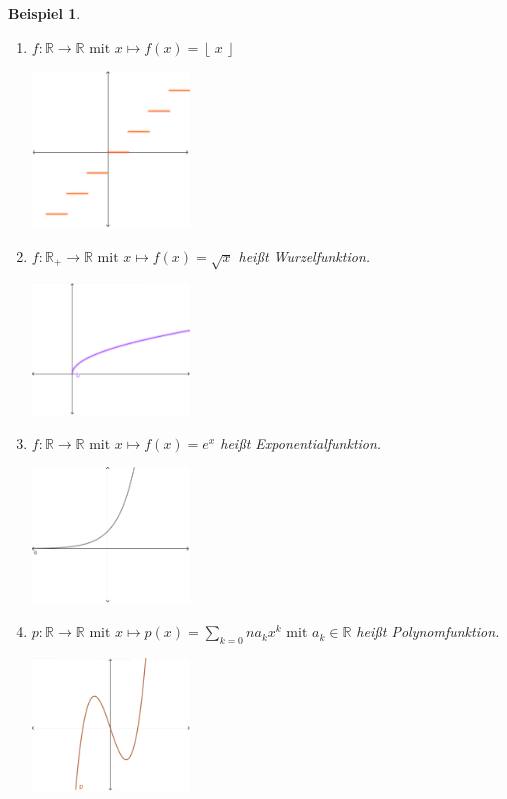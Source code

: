 \documentclass[a4paper,titlepage,oneside]{article}
\def\R{\ensuremath{\mathbb{R}} }
\newcommand{\floor}[1]{\ensuremath{\left\lfloor\:#1\:\right\rfloor}}
\theoremstyle{thmstyle}
\newtheorem{bsp}[satz]{Beispiel}
\theoremstyle{subthmstyle}
\begin{document}
\begin{bsp}
\begin{enumerate}
\begin{center}
\end{center}
\item $f : \R \to \R \text{ mit } x \mapsto f(x) = \floor{x} $ 
\begin{center}
 \includegraphics[width=0.33\textwidth]{images/floor_funktion.png}
\end{center}
\item $f : \R_+ \to \R \text{ mit } x \mapsto f(x) = \sqrt{x} $ heißt Wurzelfunktion. 
\begin{center}
 \includegraphics[width=0.33\textwidth]{images/wurzel_funktion.png}
\end{center}
\item $f : \R \to \R \text{ mit } x \mapsto f(x) = e^x $ heißt Exponentialfunktion. 
\begin{center}
 \includegraphics[width=0.33\textwidth]{images/exponential_funktion.png}
\end{center}
\item $p : \R \to \R \text{ mit } x \mapsto p(x) = \sum_{k=0}{n}{a_kx^k} \text{ mit } a_k \in \R $ heißt Polynomfunktion. 
\begin{center}
 \includegraphics[width=0.33\textwidth]{images/polynom_funktion.png}
\end{center}
\end{enumerate}
\end{bsp}
\end{document}
